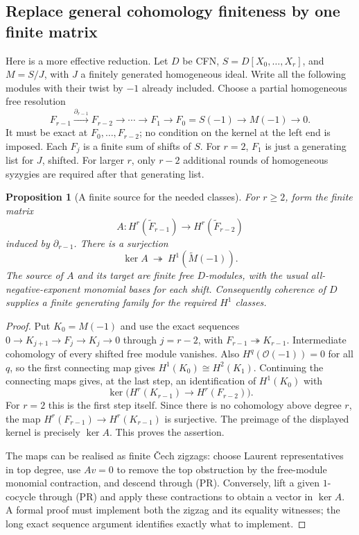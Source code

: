 \documentclass[11pt]{amsart}
\newtheorem{proposition}[theorem]{Proposition}
\theoremstyle{definition}
\theoremstyle{remark}
\newcommand{\OO}{\mathcal O}
\begin{document}
\subsection{Replace general cohomology finiteness by one finite matrix}
Here is a more effective reduction. Let $D$ be CFN,
$S=D[X_0,\ldots,X_r]$, and $M=S/J$, with $J$ a finitely generated
homogeneous ideal. Write all the following modules with their twist
by $-1$ already included. Choose a partial homogeneous free resolution
\[
 F_{r-1}\xrightarrow{\partial_{r-1}}F_{r-2}\longrightarrow
 \cdots\longrightarrow F_1\longrightarrow F_0=S(-1)
 \longrightarrow M(-1)\longrightarrow0.
 \tag{PR}
\]
It must be exact at $F_0,\ldots,F_{r-2}$; no condition on the kernel
at the left end is imposed. Each $F_j$ is a finite sum of shifts of
$S$. For $r=2$, $F_1$ is just a generating list for $J$, shifted.
For larger $r$, only $r-2$ additional rounds of homogeneous syzygies
are required after that generating list.

\begin{proposition}[A finite source for the needed classes]\label{prop:matrix}
For $r\geq2$, form the finite matrix
\[
 A:H^r(\widetilde F_{r-1})\longrightarrow
       H^r(\widetilde F_{r-2})
\]
induced by $\partial_{r-1}$. There is a surjection
\[
 \ker A\ \twoheadrightarrow\ H^1(\widetilde M(-1)).
\]
The source of $A$ and its target are finite free $D$-modules, with
the usual all-negative-exponent monomial bases for each shift.
Consequently coherence of $D$ supplies a finite generating family
for the required $H^1$ classes.
\end{proposition}
\begin{proof}
Put $K_0=M(-1)$ and use the exact sequences
$0\to K_{j+1}\to F_j\to K_j\to0$ through $j=r-2$,
with $F_{r-1}\twoheadrightarrow K_{r-1}$.
Intermediate cohomology of every shifted free module vanishes.
Also $H^q(\OO(-1))=0$ for all $q$, so the first connecting map
gives $H^1(K_0)\cong H^2(K_1)$. Continuing the connecting maps gives,
at the last step, an identification of $H^1(K_0)$ with
\[
 \ker\bigl(H^r(K_{r-1})\to H^r(F_{r-2})\bigr).
\]
For $r=2$ this is the first step itself. Since there is no cohomology
above degree $r$, the map
$H^r(F_{r-1})\to H^r(K_{r-1})$ is surjective. The preimage of the
displayed kernel is precisely $\ker A$. This proves the assertion.

The maps can be realised as finite \v Cech zigzags: choose Laurent
representatives in top degree, use $A v=0$ to remove the top
obstruction by the free-module monomial contraction, and descend
through (PR). Conversely, lift a given $1$-cocycle through (PR) and
apply these contractions to obtain a vector in $\ker A$. A formal
proof must implement both the zigzag and its equality witnesses;
the long exact sequence argument identifies exactly what to implement.
\end{proof}
\end{document}
